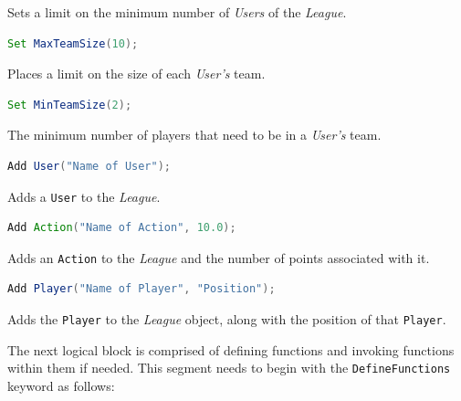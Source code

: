 \documentclass[12pt]{report}
\begin{document}
Sets a limit on the minimum number of \textit{Users} of the \textit{League}.

\begin{singlespace}
\begin{lstlisting}[language=Java,label=some-code,caption={Setting maximum size of each team.}]
Set MaxTeamSize(10);
\end{lstlisting}
\end{singlespace}

Places a limit on the size of each \textit{User's} team.

\begin{singlespace}
\begin{lstlisting}[language=Java,label=some-code,caption={Setting minimum size of each team.}]
Set MinTeamSize(2);
\end{lstlisting}
\end{singlespace}

The minimum number of players that need to be in a \textit{User's} team.

\begin{singlespace}
\begin{lstlisting}[language=Java,label=some-code,caption={Adding a \texttt{User}.}]
Add User("Name of User");
\end{lstlisting}
\end{singlespace}

Adds a \texttt{User} to the \textit{League}.

\begin{singlespace}
\begin{lstlisting}[language=Java,label=some-code,caption={Adding an \texttt{Action}.}]
Add Action("Name of Action", 10.0);
\end{lstlisting}
\end{singlespace}

Adds an \texttt{Action} to the \textit{League} and the number of points associated with it.

\begin{singlespace}
\begin{lstlisting}[language=Java,label=some-code,caption={Adding a \texttt{Player}.}]
Add Player("Name of Player", "Position");	
\end{lstlisting}
\end{singlespace}

Adds the \texttt{Player} to the \textit{League} object, along with the position of that \texttt{Player}.

The next logical block is comprised of defining functions and invoking functions within them if needed. This segment needs to begin with the \texttt{DefineFunctions} keyword as follows:
\end{document}
